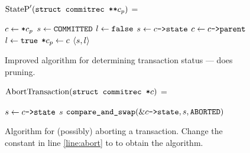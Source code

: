 \documentclass[11pt,notitlepage]{article}
\newcommand{\ptr}{\code{->}}
\begin{document}
\begin{figure}
$\text{StateP}'(\texttt{struct commitrec **} c_p)$ =
\begin{myalgorithmic}
\STATE $c \gets \texttt{*}c_p$
\STATE $s \gets \texttt{COMMITTED}$
\STATE $l \gets \texttt{false}$
  \STATE $s \gets c\ptr\code{state}$ 
    \BREAK
  \ENDIF
  \STATE $c \gets c \ptr \code{parent}$
  \STATE $l \gets \texttt{true}$
\ENDWHILE
{}
  \STATE $\texttt{*}c_p \gets c$ 
\ENDIF
\RETURN $\left\langle s,l \right\rangle$
\end{myalgorithmic}
\caption{Improved algorithm for determining transaction status ---
         does pruning.}
\label{fig:statepprime}
\end{figure}

\begin{figure}
$\text{AbortTransaction}(\texttt{struct commitrec *} c)$ =
\begin{myalgorithmic}
  \RETURN {}
\ENDIF
\LOOP
  \STATE $s \gets c\ptr\code{state}$
    \RETURN $s$
  \ENDIF
  \STATE $\code{compare\_and\_swap}(\&c\ptr\code{state}, s, \code{ABORTED})$
         \label{line:abort}
\ENDLOOP*
\end{myalgorithmic}
\caption{Algorithm for (possibly) aborting a transaction.
         Change the constant  in line \ref{line:abort}
         to  to obtain the  algorithm.}
\label{fig:aborttrans}
\end{figure}
\end{document}
